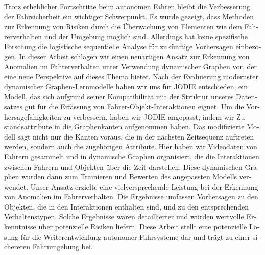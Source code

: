 \begin{otherlanguage}{ngerman} %
    Trotz erheblicher Fortschritte beim autonomen Fahren bleibt die Verbesserung der Fahrsicherheit ein wichtiger Schwerpunkt. Es wurde gezeigt, dass Methoden zur Erkennung von Risiken durch die Überwachung von Elementen wie dem Fahrerverhalten und der Umgebung möglich sind. Allerdings hat keine spezifische Forschung die logistische sequentielle Analyse für zukünftige Vorhersagen einbezogen. In dieser Arbeit schlagen wir einen neuartigen Ansatz zur Erkennung von Anomalien im Fahrerverhalten unter Verwendung dynamischer Graphen vor, der eine neue Perspektive auf dieses Thema bietet. Nach der Evaluierung modernster dynamischer Graphen-Lernmodelle haben wir uns für JODIE entschieden, ein Modell, das sich aufgrund seiner Kompatibilität mit der Struktur unseres Datensatzes gut für die Erfassung von Fahrer-Objekt-Interaktionen eignet. Um die Vorhersagefähigkeiten zu verbessern, haben wir JODIE angepasst, indem wir Zustandsattribute in die Graphenkanten aufgenommen haben. Das modifizierte Modell sagt nicht nur die Kanten voraus, die in der nächsten Zeitsequenz auftreten werden, sondern auch die zugehörigen Attribute. Hier haben wir Videodaten von Fahrern gesammelt und in dynamische Graphen organisiert, die die Interaktionen zwischen Fahrern und Objekten über die Zeit darstellen. Diese dynamischen Graphen wurden dann zum Trainieren und Bewerten des angepassten Modells verwendet. Unser Ansatz erzielte eine vielversprechende Leistung bei der Erkennung von Anomalien im Fahrerverhalten. Die Ergebnisse umfassen Vorhersagen zu den Objekten, die in den Interaktionen enthalten sind, und zu den entsprechenden Verhaltenstypen. Solche Ergebnisse wären detaillierter und würden wertvolle Erkenntnisse über potenzielle Risiken liefern. Diese Arbeit stellt eine potenzielle Lösung für die Weiterentwicklung autonomer Fahrsysteme dar und trägt zu einer sichereren Fahrumgebung bei.

\end{otherlanguage}


\makeatletter
{}
{\renewcommand{\abstractname}{Abstract}}
{\renewcommand{\abstractname}{Kurzfassung}}
\makeatother